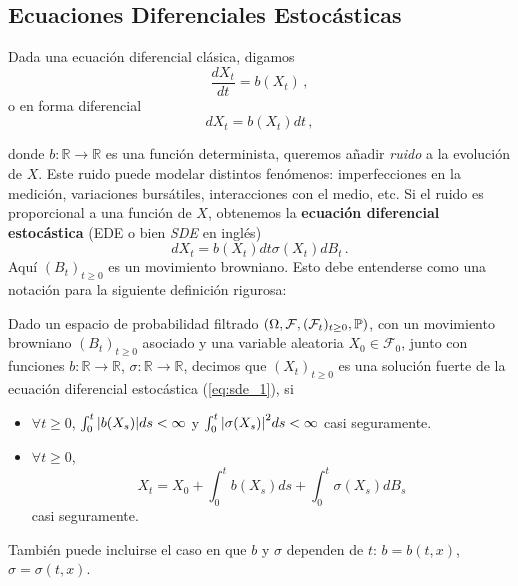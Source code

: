 \subsection{Ecuaciones Diferenciales Estocásticas}
Dada una ecuación diferencial clásica, digamos 
\begin{equation*}
        \frac{dX_t}{dt} = b(X_t)\,,
\end{equation*}
o en forma diferencial 
\begin{equation*}
        dX_t = b(X_t) dt\,,
\end{equation*}

donde $b: \mathbb{R} \to \mathbb{R}$ es una función determinista, queremos añadir \textit{ruido} a la evolución 
de $X$. Este ruido puede modelar distintos fenómenos: imperfecciones en la medición, variaciones 
bursátiles, interacciones con el medio, etc. Si el ruido es proporcional a una función de $X$, obtenemos 
la \textbf{ecuación diferencial estocástica} (EDE o bien \textit{SDE} en inglés)
\begin{equation*}
        \label{eq:sde_1}
        \tag{*}
        dX_t = b(X_t) dt \sigma (X_t) dB_t \,.
\end{equation*}
Aquí $(B_t)_{t \ge  0}$ es un movimiento browniano. Esto debe entenderse como una notación para 
la siguiente definición rigurosa:
\begin{definition}
Dado un espacio de probabilidad filtrado $(\Omega, \mathcal{F},(\mathcal{F}_t)_{t \geq 0}, \P)$, con un movimiento browniano $(B_t)_{t \ge 0}$ asociado y una variable aleatoria $X_0 \in \mathcal{F}_0$, junto con funciones $b: \mathbb{R} \to \mathbb{R}$, $\sigma: \mathbb{R} \to \mathbb{R}$, decimos que $(X_t)_{t \ge 0}$ es una solución fuerte de la ecuación diferencial estocástica (\ref{eq:sde_1}), si 
\begin{itemize}
\item $\displaystyle \forall  t \ge  0$, $\int_{0}^{t} \abs{b(X_s)} ds < \infty$ y 
     $\int_{0}^{t} \abs{\sigma (X_s)}^2 ds < \infty$ casi seguramente.
\item $\forall  t \ge 0$,
\begin{equation*}
     \label{eq:sde_2}
     \tag{**}
     X_t = X_0 + \int_{0}^{t} b(X_s) ds  + \int_{0}^{t} \sigma (X_s) dB_s 
\end{equation*}
casi seguramente. 
\end{itemize}
\end{definition}
\begin{remark}
    También puede incluirse el caso en que $b$ y $\sigma$ dependen de $t$: $b = b(t,x)$, $\sigma = \sigma(t,x)$. 
\end{remark}

